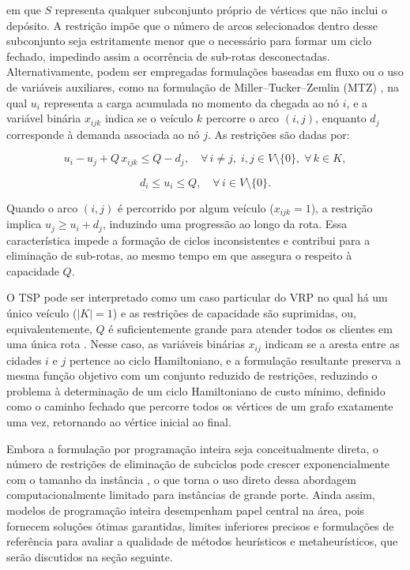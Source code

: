\noindent em que $S$ representa qualquer subconjunto próprio de vértices que não inclui o depósito. A restrição impõe que o número de arcos selecionados dentro desse subconjunto seja estritamente menor que o necessário para formar um ciclo fechado, impedindo assim a ocorrência de sub-rotas desconectadas. Alternativamente, podem ser empregadas formulações baseadas em fluxo ou o uso de variáveis auxiliares, como na formulação de Miller--Tucker--Zemlin (MTZ) \cite{miller1960integer}, na qual $u_i$ representa a carga acumulada no momento da chegada ao nó $i$, e a variável binária $x_{ijk}$ indica se o veículo $k$ percorre o arco $(i,j)$, enquanto $d_j$ corresponde à demanda associada ao nó $j$. As restrições são dadas por:

\begin{equation}
    u_i - u_j + Q\, x_{ijk} \leq Q - d_j, 
    \quad \forall\, i \neq j,\; i,j \in V \setminus \{0\},\; \forall\, k \in K,
    \label{eq:mtz1}
\end{equation}

\begin{equation}
    d_i \leq u_i \leq Q, \quad \forall\, i \in V \setminus \{0\}.
    \label{eq:mtz2}
\end{equation}

Quando o arco $(i,j)$ é percorrido por algum veículo ($x_{ijk} = 1$), a restrição implica $u_j \geq u_i + d_j$, induzindo uma progressão ao longo da rota. Essa característica impede a formação de ciclos inconsistentes e contribui para a eliminação de sub-rotas, ao mesmo tempo em que assegura o respeito à capacidade $Q$.

O TSP pode ser interpretado como um caso particular do VRP no qual há um único veículo ($|K| = 1$) \cite{toth2002vehicle} e as restrições de capacidade são suprimidas, ou, equivalentemente, $Q$ é suficientemente grande para atender todos os clientes em uma única rota \cite{balinski1964integer, eilon1974distribution}. Nesse caso, as variáveis binárias $x_{ij}$ indicam se a aresta entre as cidades $i$ e $j$ pertence ao ciclo Hamiltoniano, e a formulação resultante preserva a mesma função objetivo com um conjunto reduzido de restrições, reduzindo o problema à determinação de um ciclo Hamiltoniano de custo mínimo, definido como o caminho fechado que percorre todos os vértices de um grafo exatamente uma vez, retornando ao vértice inicial ao final.

Embora a formulação por programação inteira seja conceitualmente direta, o número de restrições de eliminação de subciclos pode crescer exponencialmente com o tamanho da instância \cite{dantzig1954solution}, o que torna o uso direto dessa abordagem computacionalmente limitado para instâncias de grande porte. Ainda assim, modelos de programação inteira desempenham papel central na área, pois fornecem soluções ótimas garantidas, limites inferiores precisos e formulações de referência para avaliar a qualidade de métodos heurísticos e metaheurísticos, que serão discutidos na seção seguinte.